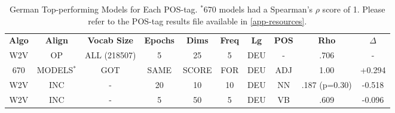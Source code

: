 \begin{table}[h]
\centering
\begin{tabular}{cccccccccc} 
\toprule
\textbf{ Algo } & \textbf{ Align } & \textbf{ Vocab Size } & \textbf{ Epochs } & \textbf{ Dims } & \textbf{ Freq } & \textbf{ Lg } & \textbf{ POS } & \textbf{ Rho } & \textbf{ $\Delta$ }  \\
W2V             & OP               & ALL (218507)          & 5                 & 25              & 5              & DEU           & -              & .706           & -               \\
670             & MODELS$^*$       & GOT                   & SAME              & SCORE           & FOR            & DEU           & ADJ            & 1.00           & +0.294          \\
W2V             & INC              & -                     & 20                & 10              & 10             & DEU           & NN             & .187 (p=0.30)  & -0.518          \\
W2V             & INC              & -                     & 5                 & 50              & 5              & DEU           & VB             & .609           & -0.096          \\
\bottomrule
\end{tabular}
\caption{German Top-performing Models for Each POS-tag. $^*$670 models had a Spearman's $\rho$ score of 1. Please refer to the POS-tag results file available in \autoref{app-resources}.}
\label{tab:deu-posresults}
\end{table}


